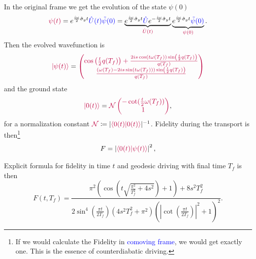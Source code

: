 In the original frame we get the evolution of the state $\psi(0)$
\begin{equation}
    \textcolor{purple}{\psi(t)}=e^{\frac{i \omega}{2}\hat\sigma_y t} \textcolor{blue}{\hat U(t) \tilde\psi(0)} = \underbrace{e^{\frac{i \omega}{2}\hat\sigma_y t} \textcolor{blue}{\hat U}e^{-\frac{i \omega}{2}\hat\sigma_y t}}_{\textcolor{purple}{\hat U(t)}} \underbrace{e^{\frac{i \omega}{2}\hat\sigma_y t} \textcolor{blue}{\tilde\psi(0)}}_{\textcolor{purple}{\psi(0)}}.
\end{equation}
Then the evolved wavefunction is
\begin{equation}
    \textcolor{purple}{\ket{\psi(t)}}=\textcolor{purple}{\begin{pmatrix}
        \cos \left(\frac{t}{2} q(T_f)\right)+\frac{2 i s \cos (t \omega(T_f) ) \sin \left(\frac{t}{2} q(T_f)\right)}{q(T_f)}\\
        \frac{(\omega(T_f) -2 i s \sin (t \omega(T_f) )) \sin \left(\frac{t}{2} q(T_f)\right)}{q(T_f)}
    \end{pmatrix}}
\end{equation}
and the ground state
\begin{equation}
    \textcolor{purple}{\ket{0(t)}}=\textcolor{purple}{\mathcal{N}\begin{pmatrix}
        -\cot (\frac{t}{2}\omega(T_f))\\
        1
    \end{pmatrix}},
\end{equation}
for a normalization constant $\textcolor{purple}{\mathcal{N}}\coloneqq |\textcolor{purple}{\braket{0(t)|0(t)}}|^{-1}$.
Fidelity during the transport is then\footnote{If we would calculate the Fidelity in \textcolor{blue}{comoving frame}, we would get exactly one. This is the essence of counterdiabatic driving.}
\begin{equation}
    F=\left|\textcolor{purple}{\braket{0(t)|\psi(t)}}\right|^2,
\end{equation}

 Explicit formula for fidelity in time $t$ and geodesic driving with final time $T_f$ is then
\begin{equation}
    F(t,T_f)=\frac{\pi ^2 \left(\cos \left(t \sqrt{\frac{\pi ^2}{T_f^2}+4 s^2}\right)+1\right)+8 s^2 T_f^2}{2 \sin ^4\left(\frac{\pi  t}{2 T_f}\right) \left(4 s^2 T_f^2+\pi ^2\right) \left(\left| \cot \left(\frac{\pi  t}{2 T_f}\right)\right|^2+1\right)^2}.
    \label{eq:fidelitySimplified}
\end{equation}



